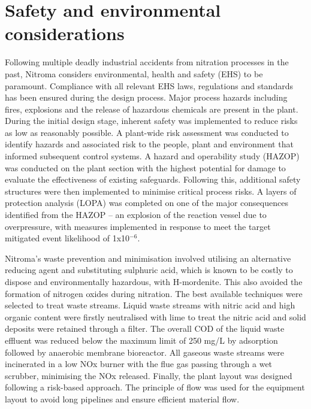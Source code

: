 \section*{Safety and environmental considerations}

Following multiple deadly industrial accidents from nitration processes in the past, Nitroma considers environmental, health and safety (EHS) to be paramount. Compliance with all relevant EHS laws, regulations and standards has been ensured during the design process.  Major process hazards including fires, explosions and the release of hazardous chemicals are present in the plant.   During the initial design stage, inherent safety was implemented to reduce risks as low as reasonably possible. A plant-wide risk assessment was conducted to identify hazards and associated risk to the people, plant and environment that informed subsequent control systems. A hazard and operability study (HAZOP) was conducted on the plant section with the highest potential for damage to evaluate the effectiveness of existing safeguards. Following this, additional safety structures were then implemented to minimise critical process risks. A layers of protection analysis (LOPA) was completed on one of the major consequences identified from the HAZOP – an explosion of the reaction vessel due to overpressure, with measures implemented in response to meet the target mitigated event likelihood of 1x10$^{-6}$.  

Nitroma's waste prevention and minimisation involved utilising an alternative reducing agent and substituting sulphuric acid, which is known to be costly to dispose and environmentally hazardous, with H-mordenite. This also avoided the formation of nitrogen oxides during nitration. The best available techniques  were selected to treat waste streams. Liquid waste streams with nitric acid and high organic content were firstly neutralised with lime to treat the nitric acid and solid deposits were retained through a filter. The overall COD of the liquid waste effluent was reduced below the maximum limit of 250 mg/L by adsorption followed by anaerobic membrane bioreactor. All gaseous waste streams were incinerated in a low NOx burner with the flue gas passing through a wet scrubber, minimising the NOx released. Finally, the plant layout was designed following a risk-based approach. The principle of flow was used for the equipment layout to avoid long pipelines and ensure efficient material flow. 